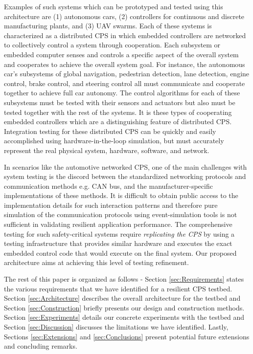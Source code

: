 Examples of such systems which can be prototyped and tested using this architecture are (1) autonomous cars, (2) controllers for continuous and discrete manufacturing plants, and (3) UAV swarms.  Each of these systems is characterized as a distributed CPS in which embedded controllers are networked to collectively control a system through cooperation.  Each subsystem or embedded computer senses and controls a specific aspect of the overall system and cooperates to achieve the overall system goal.  For instance, the autonomous car's subsystems of global navigation, pedestrian detection, lane detection, engine control, brake control, and steering control all must communicate and cooperate together to achieve full car autonomy.  The control algorithms for each of these subsystems must be tested with their sensors and actuators but also must be tested together with the rest of the systems.  It is these types of cooperating embedded controllers which are a distinguishing feature of distributed CPS.  Integration testing for these distributed CPS can be quickly and easily accomplished using hardware-in-the-loop simulation, but must accurately represent the real physical system, hardware, software, and network. 

In scenarios like the automotive networked CPS, one of the main challenges with system testing is the discord between the standardized networking protocols and communication methods e.g. CAN bus, and the manufacturer-specific implementations of these methods. It is difficult to obtain public access to the implementation details for such interaction patterns and therefore pure simulation of the communication protocols using event-simulation tools  is not sufficient in validating resilient application performance. The comprehensive testing for such safety-critical systems require \emph{replicating the CPS} by using a testing infrastructure that provides similar hardware and executes the exact embedded control code that would execute on the final system. Our proposed architecture aims at achieving this level of testing refinement.


The rest of this paper is organized as follows - Section \ref{sec:Requirements} states the various requirements that we have identified for a resilient CPS testbed. Section \ref{sec:Architecture} describes the overall architecture for the testbed and Section \ref{sec:Construction} briefly presents our design and construction methods. Section \ref{sec:Experiments} details our concrete experiments with the testbed and Section \ref{sec:Discussion} discusses the limitations we have identified. Lastly, Sections \ref{sec:Extensions} and \ref{sec:Conclusions} present potential future extensions and concluding remarks.  

